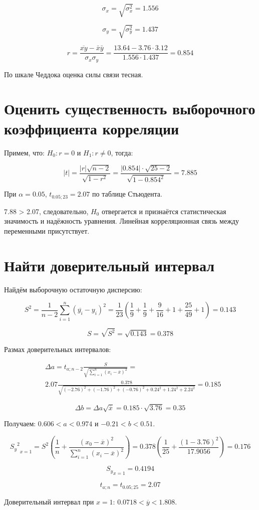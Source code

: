 $$\sigma_x = \sqrt{{\sigma_x^2}} = 1.556$$

$$\sigma_y = \sqrt{{\sigma_y^2}} = 1.437$$

$$r = \frac{\overline{xy} - \bar{x} \bar{y}}{\sigma_x \sigma_y}= \frac{13.64 - 3.76 \cdot 3.12}{1.556 \cdot 1.437} = 0.854$$

По шкале Чеддока оценка силы связи тесная.

\section{Оценить существенность выборочного коэффициента корреляции}

Примем, что: $H_0: r = 0$ и $H_1: r \neq 0$, тогда:

$$|t| = \frac{|r| \sqrt{n - 2}}{\sqrt{1 - r^2}} = \frac{|0.854| \cdot \sqrt{25 - 2}}{\sqrt{1 - 0.854^2}} = 7.885$$

При $\alpha = 0.05$, $t_{0.05;23} = 2.07$ по таблице Стьюдента.

7.88 > 2.07, следовательно, $H_0$ отвергается и признаётся статистическая значимость и надёжность уравнения. Линейная корреляционная связь между переменными присутствует.

\section{Найти доверительный интервал}

Найдём выборочную остаточную дисперсию:

$$S^2 = \frac{1}{n - 2} \sum^n_{i=1}{(\overline{y_i} - y_i)^2} = \frac{1}{23} (\frac{1}{9} + \frac{1}{9} + \frac{9}{16} + 1 + \frac{25}{49} + 1) = 0.143$$

$$S = \sqrt{S^2} = \sqrt{0.143} = 0.378$$

Размах доверительных интервалов:

\begin{align*}
    &\Delta a = t_{a;n - 2} \frac{S}{\sqrt{\sum^n_{i=1}{(x_i - \overline{x})^2}}} = \nonumber \\
    &2.07 \frac{0.378}{\sqrt{(-2.76)^2 + (-1.76)^2 + (-0.76)^2 + 0.24^2 + 1.24^2 + 2.24^2}} = 0.185
\end{align*}

$$\Delta b = \Delta a \sqrt{\overline{x}} = 0.185 \cdot \sqrt{3.76} = 0.35$$

Получаем: $0.606 < a < 0.974$ и $-0.21 < b < 0.51$.

$${{S_y}^2}_{x=1} = S^2 \left( \frac{1}{n} + \frac{(x_0 - \overline{x})^2}{\sum^n_{i=1}{(x_i - \overline{x})^2}} \right) = 0.378 \left( \frac{1}{25} + \frac{(1 - 3.76)^2}{17.9056} \right) = 0.176 $$

$${S_y}_{x=1} = 0.4194$$

$$t_{a;n} = t_{0.05; 25} = 2.07$$

Доверительный интервал при $x=1$: $0.0718 < \overline{y} < 1.808$.

